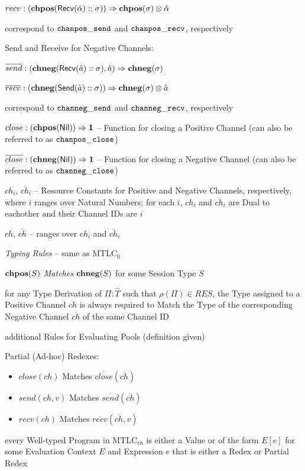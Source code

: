 $recv : (\mathbf{chpos} (\mathsf{Recv}(\hat{\alpha}) :: \sigma)) \Rightarrow
\mathbf{chpos}(\sigma) \otimes \hat{\alpha}$

correspond to $\mathtt{chanpos\_send}$ and $\mathtt{chanpos\_recv}$,
respectively

Send and Receive for Negative Channels:

$\overline{send} : (\mathbf{chneg}(\mathsf{Recv}(\hat{a}) :: \sigma), \hat{a})
\Rightarrow \mathbf{chneg}(\sigma)$

$\overline{recv} : (\mathbf{chneg}(\mathsf{Send}(\hat{a}) :: \sigma)) \Rightarrow
\mathbf{chneg}(\sigma) \otimes \hat{a}$

correspond to $\mathtt{channeg\_send}$ and $\mathtt{channeg\_recv}$,
respectively

$close : (\mathbf{chpos}(\mathsf{Nil})) \Rightarrow \mathbf{1}$ -- Function for closing a
Positive Channel (can also be referred to as $\mathtt{chanpos\_close}$)

$\overline{close} : (\mathbf{chneg}(\mathsf{Nil})) \Rightarrow \mathbf{1}$ -- Function for
closing a Negative Channel (can also be referred to as
$\mathtt{channeg\_close}$)

$ch_i$, $\overline{ch}_i$ -- Resource Constants for Positive and
Negative Channels, respectively, where $i$ ranges over Natural
Numbers; for each $i$, $ch_i$ and $\overline{ch}_i$ are Dual to
eachother and their Channel IDs are $i$

$ch$, $\overline{ch}$ -- ranges over $ch_i$ and $\overline{ch}_i$


\emph{Typing Rules} -- same as MTLC$_0$

$\mathbf{chpos}(S)$ \emph{Matches} $\mathbf{chneg}(S)$ for some Session Type $S$

for any Type Derivation of $\Pi : \hat{T}$ such that $\rho(\Pi) \in
RES$, the Type assigned to a Positive Channel $ch$ is always required
to Match the Type of the corresponding Negative Channel
$\overline{ch}$ of the same Channel ID

additional Rules for Evaluating Pools (definition given)

Partial (Ad-hoc) Redexes:
\begin{itemize}
  \item $close(ch)$ Matches $\overline{close}(\overline{ch})$
  \item $send(ch,v)$ Matches $\overline{send}(\overline{ch})$
  \item $recv(ch)$ Matches $\overline{recv}(\overline{ch},v)$
\end{itemize}

every Well-typed Program in MTLC$_{ch}$ is either a Value or of the
form $E[e]$ for some Evaluation Context $E$ and Expression $e$ that is
either a Redex or Partial Redex

